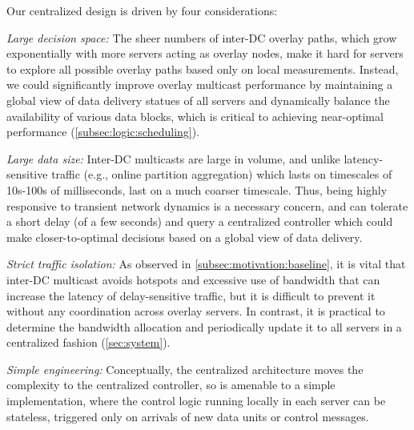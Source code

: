 Our centralized design is driven by four considerations:
\begin{packedenumerate}

\item {\em Large decision space:}
The sheer numbers of inter-DC overlay paths,
which grow exponentially with more servers acting as overlay nodes,
make it hard for servers to explore all possible overlay
paths based only on local measurements.
Instead, we could significantly improve overlay multicast
performance by maintaining a global view of data delivery 
statues of all servers and dynamically balance 
the availability of
various data blocks, which 
is critical to achieving near-optimal performance 
(\Section\ref{subsec:logic:scheduling}).

\item {\em Large data size:}
Inter-DC multicasts are large in volume, and 
unlike latency-sensitive traffic
(e.g., online partition aggregation) which lasts on timescales 
of 10s-100s of milliseconds, 
last on a much coarser timescale.
Thus, being highly responsive to transient network dynamics is a necessary concern,
and \name can tolerate a short delay (of a few seconds) and query a centralized controller 
which could make closer-to-optimal decisions based on a global view of data delivery.

\item {\em Strict traffic isolation:}
As observed in \Section\ref{subsec:motivation:baseline}, 
it is vital that inter-DC
multicast avoids hotspots and excessive use of
bandwidth that can increase the latency of delay-sensitive traffic,
but it is difficult to prevent it
without any coordination across overlay servers. 
In contrast, it is practical
to determine the bandwidth allocation and periodically update it
to all servers in a centralized fashion (\Section\ref{sec:system}).

\item {\em Simple engineering:}
Conceptually, the centralized architecture moves the complexity to
the centralized controller, so \name is amenable to a simple implementation,
where the control logic running locally in each server can be stateless, 
triggered only on arrivals of new data units or control messages.

\end{packedenumerate}

